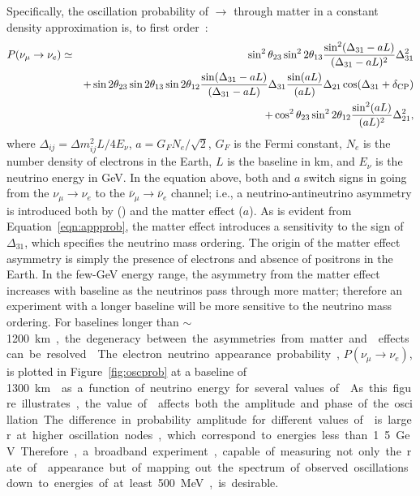 Specifically, the oscillation probability of \numu $\rightarrow$ \nue 
through matter in a constant density approximation is,  %
to first order~\cite{Nunokawa:2007qh}:
%
\begin{eqnarray}
P(\nu_\mu \rightarrow \nu_e) & \simeq & \sin^2 \theta_{23} \sin^2 2 \theta_{13} 
\frac{ \sin^2(\Delta_{31} - aL)}{(\Delta_{31}-aL)^2} \Delta_{31}^2 \nonumber \\
& & + \sin 2 \theta_{23} \sin 2 \theta_{13} \sin 2 \theta_{12} \frac{ \sin(\Delta_{31} - aL)}{(\Delta_{31}-aL)} \Delta_{31} \frac{\sin(aL)}{(aL)} \Delta_{21} \cos (\Delta_{31} + \delta_{\rm CP}) \nonumber\\
& & + \cos^2 \theta_{23} \sin^2 2 \theta_{12} \frac {\sin^2(aL)}{(aL)^2} \Delta_{21}^2, 
\label{eqn:appprob}
\end{eqnarray}
where $\Delta_{ij} = \Delta m^2_{ij} L/4E_\nu$, $a = G_FN_e/\sqrt{2}$, $G_F$ is the Fermi constant, $N_e$ is the number density of electrons in the Earth, $L$ is the baseline in km, and $E_\nu$ is the neutrino energy in GeV. 
In the equation above, both \deltacp and $a$ 
switch signs in going from the
$\nu_\mu \to \nu_e$ to the $\bar{\nu}_\mu \to \bar{\nu}_e$ channel; i.e.,
a neutrino-antineutrino asymmetry is introduced both by  (\deltacp)
and the matter effect ($a$). As is evident from Equation~\ref{eqn:appprob}, 
the matter effect introduces a sensitivity to the sign of $\Delta_{31}$, 
which specifies the neutrino mass ordering.
The origin of the matter effect asymmetry 
is simply the presence of electrons and absence of positrons in the Earth.  
In the few-GeV energy range, the asymmetry from the matter effect increases 
with baseline as the neutrinos
pass through more matter; therefore an experiment with a longer baseline will be
more sensitive to the neutrino mass ordering. For baselines longer than 
$\sim$\SI{1200}\km, the degeneracy between the asymmetries from matter
and  effects can be resolved~\cite{Bass:2013vcg}.

The electron neutrino appearance probability, $P(\nu_\mu \rightarrow \nu_e)$, 
is plotted in 
Figure~\ref{fig:oscprob} at a baseline of \SI{1300}\km{} as a function of neutrino 
energy for several values of \deltacp. As this figure illustrates, the value 
of \deltacp affects both the amplitude and phase of
the oscillation. The difference in probability amplitude
for different values of \deltacp is larger at higher oscillation nodes, which 
correspond to energies less than 1.5~GeV. Therefore, a broadband experiment, 
capable of measuring not only the rate of \nue appearance but of mapping out the 
spectrum of observed oscillations down to energies of at least 500~MeV, is desirable. 


